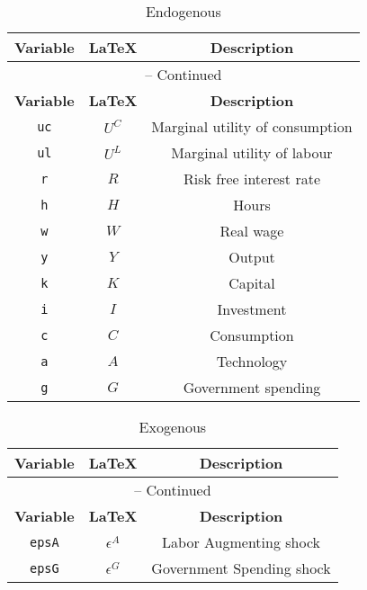 \begin{center}
\begin{longtable}{ccc}
\caption{Endogenous}\\%
\hline%
\multicolumn{1}{c}{\textbf{Variable}} &
\multicolumn{1}{c}{\textbf{\LaTeX}} &
\multicolumn{1}{c}{\textbf{Description}}\\%
\hline\hline%
\endfirsthead
\multicolumn{3}{c}{{\tablename} \thetable{} -- Continued}\\%
\hline%
\multicolumn{1}{c}{\textbf{Variable}} &
\multicolumn{1}{c}{\textbf{\LaTeX}} &
\multicolumn{1}{c}{\textbf{Description}}\\%
\hline\hline%
\endhead
\texttt{uc} & $U^{C}$ & Marginal utility of consumption\\
\texttt{ul} & $U^{L}$ & Marginal utility of labour\\
\texttt{r} & $R$ & Risk free interest rate\\
\texttt{h} & $H$ & Hours\\
\texttt{w} & $W$ & Real wage\\
\texttt{y} & $Y$ & Output\\
\texttt{k} & $K$ & Capital\\
\texttt{i} & $I$ & Investment\\
\texttt{c} & $C$ & Consumption\\
\texttt{a} & $A$ & Technology\\
\texttt{g} & $G$ & Government spending\\
\hline%
\end{longtable}
\end{center}
\begin{center}
\begin{longtable}{ccc}
\caption{Exogenous}\\%
\hline%
\multicolumn{1}{c}{\textbf{Variable}} &
\multicolumn{1}{c}{\textbf{\LaTeX}} &
\multicolumn{1}{c}{\textbf{Description}}\\%
\hline\hline%
\endfirsthead
\multicolumn{3}{c}{{\tablename} \thetable{} -- Continued}\\%
\hline%
\multicolumn{1}{c}{\textbf{Variable}} &
\multicolumn{1}{c}{\textbf{\LaTeX}} &
\multicolumn{1}{c}{\textbf{Description}}\\%
\hline\hline%
\endhead
\texttt{epsA} & ${\epsilon^{A}}$ & Labor Augmenting shock\\
\texttt{epsG} & ${\epsilon^{G}}$ & Government Spending shock\\
\hline%
\end{longtable}
\end{center}
